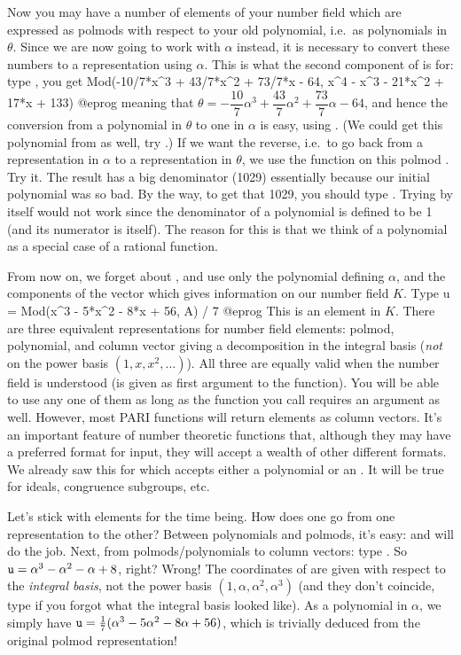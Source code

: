 Now you may have a number of elements of your number field which are
expressed as polmods with respect to your old polynomial, i.e.~as polynomials
in $\theta$. Since we are now going to work with $\alpha$ instead, it is
necessary to convert these numbers to a representation using $\alpha$. This
is what the second component of  is for: type , you get
\bprog
  Mod(-10/7*x^3 + 43/7*x^2 + 73/7*x - 64, x^4 - x^3 - 21*x^2 + 17*x + 133)
@eprog\noindent
meaning that $\theta =
-\dfrac{10}{7}\alpha^3+\dfrac{43}{7}\alpha^2+\dfrac{73}{7}\alpha-64$, and hence the conversion from a
polynomial in $\theta$ to one in $\alpha$ is easy, using . (We
could get this polynomial from  as well, try .)
If we want the reverse, i.e.~to go back from a representation in $\alpha$ to
a representation in $\theta$, we use the function  on this
polmod . Try it. The result has a big denominator (1029) essentially
because our initial polynomial  was so bad. By the way, to get that
1029,
you should type . Trying  by
itself would not work since the denominator of a polynomial is defined to be
1 (and its numerator is itself). The reason for this is that we think of a
polynomial as a special case of a rational function.\smallskip

From now on, we forget about , and use only the polynomial
 defining $\alpha$, and the components of the vector  which
gives information on our number field $K$. Type
\bprog
  u = Mod(x^3 - 5*x^2 - 8*x + 56, A) / 7
@eprog\noindent
This is an element in $K$. There are three equivalent
representations for number field elements: polmod, polynomial, and column
vector giving a decomposition in the integral basis  (\emph{not} on
the power basis $(1,x,x^2,\dots)$). All three are equally valid when the
number field is understood (is given as first argument to the function).
You will be able to use any one of them as long as the function you call
requires an  argument as well. However, most PARI functions will
return elements as column vectors. It's an important feature of number
theoretic functions that, although they may have a preferred format for
input, they will accept a wealth of other different formats. We already saw
this for  which accepts either a polynomial or an . It
will be true for ideals, congruence subgroups, etc.

  Let's stick with elements for the time being. How does one go from one
representation to the other? Between polynomials and polmods, it's easy:
 and  will do the job. Next, from polmods/polynomials to
column vectors: type . So ${\tt u} = \alpha^3-
\alpha^2 - \alpha + 8$, right? Wrong! The coordinates of  are given
with respect to the \emph{integral basis}, not the power basis
$(1,\alpha,\alpha^2,\alpha^3)$ (and they don't coincide, type  if
you forgot what the integral basis looked like). As a polynomial in $\alpha$,
we simply have ${\tt u} = {1\over7}(\alpha^3 - 5\alpha^2-8\alpha+56)$, which
is trivially deduced from the original polmod representation!

